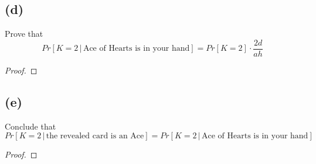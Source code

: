 \documentclass[14pt]{extarticle}
\begin{document}
\subsection{(d)}
Prove that
$$
Pr[K = 2 \,|\, \text{Ace of Hearts is in your hand}] = Pr[K = 2] \cdot \frac{2d}{ah}
$$
\begin{proof}
\end{proof}

\subsection{(e)}
Conclude that
$$
Pr[K = 2 \,|\, \text{the revealed card is an Ace}] = Pr[K = 2 \,|\, \text{Ace of Hearts is in your hand}]
$$
\begin{proof}
\end{proof}
\end{document}
